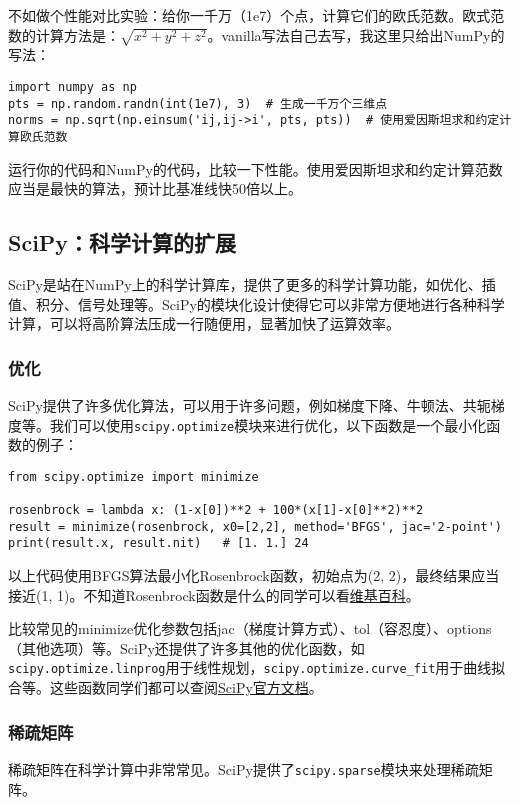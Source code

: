 \documentclass[../main.tex]{subfiles}
\begin{document}
不如做个性能对比实验：给你一千万（1e7）个点，计算它们的欧氏范数。欧式范数的计算方法是：$\sqrt{x^2 + y^2 + z^2}$。vanilla写法自己去写，我这里只给出NumPy的写法：
\begin{lstlisting}
import numpy as np
pts = np.random.randn(int(1e7), 3)  # 生成一千万个三维点
norms = np.sqrt(np.einsum('ij,ij->i', pts, pts))  # 使用爱因斯坦求和约定计算欧氏范数
\end{lstlisting}
运行你的代码和NumPy的代码，比较一下性能。使用爱因斯坦求和约定计算范数应当是最快的算法，预计比基准线快50倍以上。

\subsection{SciPy：科学计算的扩展}

SciPy是站在NumPy上的科学计算库，提供了更多的科学计算功能，如优化、插值、积分、信号处理等。SciPy的模块化设计使得它可以非常方便地进行各种科学计算，可以将高阶算法压成一行随便用，显著加快了运算效率。

\subsubsection{优化}
SciPy提供了许多优化算法，可以用于许多问题，例如梯度下降、牛顿法、共轭梯度等。我们可以使用\texttt{scipy.optimize}模块来进行优化，以下函数是一个最小化函数的例子：
\begin{lstlisting}
from scipy.optimize import minimize

rosenbrock = lambda x: (1-x[0])**2 + 100*(x[1]-x[0]**2)**2
result = minimize(rosenbrock, x0=[2,2], method='BFGS', jac='2-point')
print(result.x, result.nit)   # [1. 1.] 24
\end{lstlisting}
以上代码使用BFGS算法最小化Rosenbrock函数，初始点为(2, 2)，最终结果应当接近(1, 1)。不知道Rosenbrock函数是什么的同学可以看\href{https://en.wikipedia.org/wiki/Rosenbrock_function}{维基百科}。

比较常见的minimize优化参数包括jac（梯度计算方式）、tol（容忍度）、options（其他选项）等。SciPy还提供了许多其他的优化函数，如\texttt{scipy.optimize.linprog}用于线性规划，\texttt{scipy.optimize.curve\_fit}用于曲线拟合等。这些函数同学们都可以查阅\href{https://docs.scipy.org/doc/scipy/reference/optimize.html}{SciPy官方文档}。

\subsubsection{稀疏矩阵}

稀疏矩阵在科学计算中非常常见。SciPy提供了\texttt{scipy.sparse}模块来处理稀疏矩阵。
\end{document}
